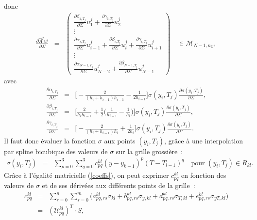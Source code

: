 donc
\begin{eqnarray}
\frac{\partial\hat{A}^ju^j}{\partial \Sigma} &=& 
\begin{pmatrix}
\frac{\partial\beta_{1,T_j}}{\partial \Sigma} u_1^j + 
\frac{\partial\gamma_{1,T_j}}{\partial \Sigma}u_2^j \\
\vdots \\
\frac{\partial\alpha_{i,T_j}}{\partial \Sigma}u_{i-1}^j + 
\frac{\partial\beta_{i,T_j}}{\partial \Sigma}u_i^j + 
\frac{\partial\gamma_{i,T_j}}{\partial \Sigma}u_{i+1}^j \\
\vdots \\
\frac{\partial\alpha_{N-1,T_j}}{\partial \Sigma}u_{N-2}^j + 
\frac{\partial\beta_{N-1,T_j}}{\partial \Sigma}u_{N-1}^j 
\end{pmatrix}
\quad \in \mathcal{M}_{N-1,n_{\Sigma}}, \label{deriv_Ajuj_Sigma}
\end{eqnarray}
avec
\begin{eqnarray*}
\frac{\partial \alpha_{i,T_j}}{\partial \Sigma} &=& 
\biggl[ -\frac{2}{(h_i+h_{i-1})h_{i-1}}-\frac{1}{2h_{i-1}}\biggr]
\sigma(y_i,T_j)\frac{\partial \sigma(y_i,T_j)}{\partial \Sigma},\\
\frac{\partial \beta_{i,T_j}}{\partial \Sigma} &=& 
\biggl[\frac{2}{h_ih_{i-1}} + \frac{1}{2}\biggl(\frac{1}{h_{i-1}}-
\frac{1}{h_i}\biggr)\biggr]\sigma(y_i,T_j)
\frac{\partial \sigma(y_i,T_j)}{\partial \Sigma},\\
\frac{\partial \gamma_{i,T_j}}{\partial \Sigma} &=& 
\biggl[ -\frac{2}{(h_i+h_{i-1})h_i}+\frac{1}{2h_i}\biggr]
\sigma(y_i,T_j)\frac{\partial \sigma(y_i,T_j)}{\partial \Sigma}.
\end{eqnarray*}
Il faut donc \'evaluer la fonction $\sigma$ aux points $(y_i,T_j)$, 
gr\^ace \`a une interpolation par spline bicubique des valeurs de 
$\sigma$ sur la grille grossi\`ere~:
\begin{eqnarray*}
\sigma(y_i,T_j) &=& \sum_{p=0}^3\sum_{q=0}^3 c_{pq}^{kl} 
(y-y_{k-1})^p(T-T_{l-1})^q \quad \text{pour } (y_i,T_j) \in R_{kl}.
\end{eqnarray*}
Gr\^ace \`a l'\'egalit\'e matricielle (\ref{coeffs}), on peut 
exprimer $c_{pq}^{kl}$ en fonction des valeurs de $\sigma$ et de 
ses d\'eriv\'ees aux diff\'erents points de la grille~:
\begin{eqnarray*}
c_{pq}^{kl} &=& \sum_{r=0}^{n}\sum_{s=0}^{m}
\biggl(a_{pq,rs}^{kl}\sigma_{kl} + b_{pq,rs}^{kl}\sigma_{y,kl} + 
d_{pq,rs}^{kl}\sigma_{T,kl} + e_{pq,rs}^{kl}\sigma_{yT,kl}\biggr)\\
&=& (\mathcal{U}_{pq}^{kl})^T \cdot S,
\end{eqnarray*}
